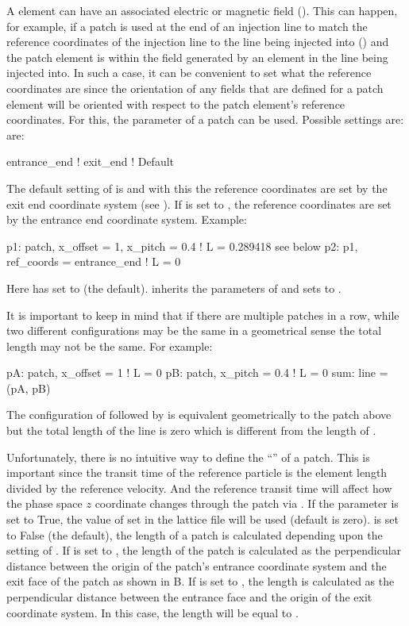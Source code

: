 {A  element can have an associated electric or magnetic field (). This can
happen, for example, if a patch is used at the end of an injection line to match the reference
coordinates of the injection line to the line being injected into () and the patch
element is within the field generated by an element in the line being injected into. In such a case,
it can be convenient to set what the reference coordinates are since the orientation of any fields
that are defined for a patch element will be oriented with respect to the patch element's reference
coordinates. For this, the 
parameter of a patch can be used. Possible settings are:
 are:
\begin{example}
  entrance_end  !
  exit_end      ! Default
\end{example}
The default setting of  is  and with this the reference coordinates are
set by the exit end coordinate system (see ). If  is set to
, the reference coordinates are set by the entrance end coordinate system. Example:
\begin{example}
  p1: patch, x_offset = 1, x_pitch = 0.4   ! L = 0.289418 see below
  p2: p1, ref_coords = entrance_end        ! L = 0
\end{example}
Here  has  set to  (the default).  inherits the parameters
of  and sets  to .

It is important to keep in mind that if there are multiple patches in a row, while two different
configurations may be the same in a geometrical sense the total length may not be the same. For
example:
\begin{example}
  pA: patch, x_offset = 1    ! L = 0
  pB: patch, x_pitch = 0.4   ! L = 0
  sum: line = (pA, pB)
\end{example}
The configuration of  followed by  is equivalent geometrically to the  patch
above but the total length of the  line is zero which is different from the length of
.

Unfortunately, there is no intuitive way to define the ``''  of a patch. This is
important since the transit time of the reference particle is the element length divided by the
reference velocity. And the reference transit time will affect how the phase space $z$ coordinate
changes through the patch via . If the parameter  is set to True, the
value of  set in the lattice file will be used (default is zero).  is set
to False (the default), the length of a patch is calculated depending upon the setting of
.  If  is set to , the length of the patch is calculated
as the perpendicular distance between the origin of the patch's entrance coordinate system and the
exit face of the patch as shown in B. If  is set to ,
the length is calculated as the perpendicular distance between the entrance face and the origin of
the exit coordinate system. In this case, the length will be equal to .

}
